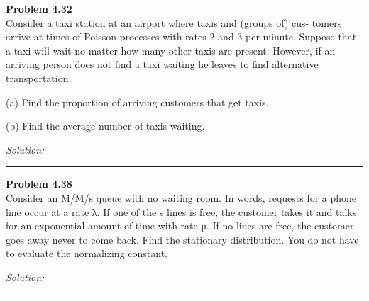 \documentclass[a4paper, 11pt]{article}
\newenvironment{problem}[2][Problem]
    { \begin{mdframed}[backgroundcolor=gray!20] \textbf{#1 #2} \\}
    {  \end{mdframed}}
\newenvironment{solution}
    {\textit{Solution:}}
    {}
\begin{document}
\begin{problem}{4.32}
Consider a taxi station at an airport where taxis and (groups of) cus- tomers arrive at times of Poisson processes with rates 2 and 3 per minute. Suppose that a taxi will wait no matter how many other taxis are present. However, if an arriving person does not find a taxi waiting he leaves to find alternative transportation. 

(a) Find the proportion of arriving customers that get taxis.

(b) Find the average number of taxis waiting.

\end{problem}
\begin{solution}

\end{solution} 
%
\noindent\rule{7in}{2.8pt}

\begin{problem}{4.38}
 Consider an M/M/s queue with no waiting room. In words, requests for a phone line occur at a rate λ. If one of the s lines is free, the customer takes it and talks for an exponential amount of time with rate μ. If no lines are free, the customer goes away never to come back. Find the stationary distribution. You do not have to evaluate the normalizing constant.


\end{problem}
\begin{solution}

\end{solution} 
%
\noindent\rule{7in}{2.8pt}
\end{document}
